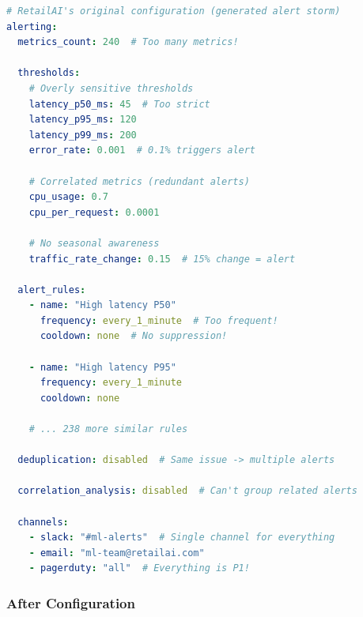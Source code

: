 \begin{lstlisting}[language=yaml, caption={Alert Storm Configuration (Problematic)}]
# RetailAI's original configuration (generated alert storm)
alerting:
  metrics_count: 240  # Too many metrics!

  thresholds:
    # Overly sensitive thresholds
    latency_p50_ms: 45  # Too strict
    latency_p95_ms: 120
    latency_p99_ms: 200
    error_rate: 0.001  # 0.1% triggers alert

    # Correlated metrics (redundant alerts)
    cpu_usage: 0.7
    cpu_per_request: 0.0001

    # No seasonal awareness
    traffic_rate_change: 0.15  # 15% change = alert

  alert_rules:
    - name: "High latency P50"
      frequency: every_1_minute  # Too frequent!
      cooldown: none  # No suppression!

    - name: "High latency P95"
      frequency: every_1_minute
      cooldown: none

    # ... 238 more similar rules

  deduplication: disabled  # Same issue -> multiple alerts

  correlation_analysis: disabled  # Can't group related alerts

  channels:
    - slack: "#ml-alerts"  # Single channel for everything
    - email: "ml-team@retailai.com"
    - pagerduty: "all"  # Everything is P1!
\end{lstlisting}

\subsubsection{After Configuration}

